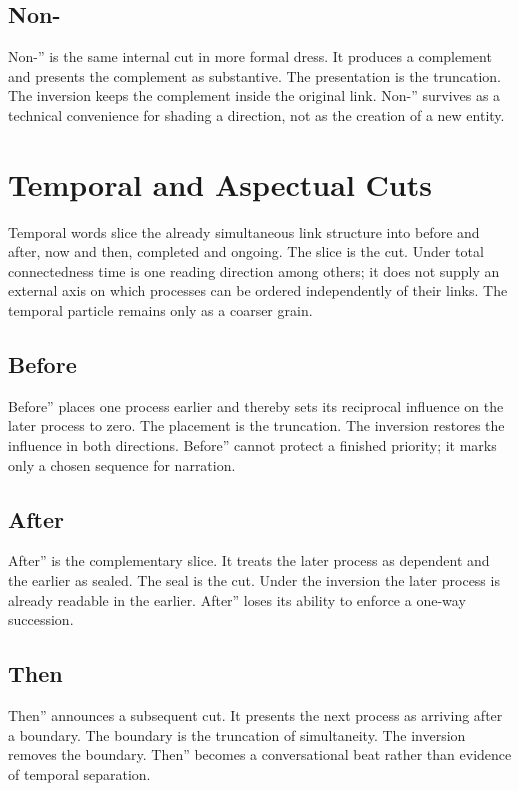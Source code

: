 \documentclass[11pt,a4paper]{article}
\begin{document}
\subsection{Non-} Non-'' is the same internal cut in more formal dress. It produces a complement and presents the complement as substantive. The presentation is the truncation. The inversion keeps the complement inside the original link. Non-'' survives as a technical convenience for shading a direction, not as the creation of a new entity.

\section{Temporal and Aspectual Cuts}

Temporal words slice the already simultaneous link structure into before and after, now and then, completed and ongoing. The slice is the cut. Under total connectedness time is one reading direction among others; it does not supply an external axis on which processes can be ordered independently of their links. The temporal particle remains only as a coarser grain.

\subsection{Before} Before'' places one process earlier and thereby sets its reciprocal influence on the later process to zero. The placement is the truncation. The inversion restores the influence in both directions. Before'' cannot protect a finished priority; it marks only a chosen sequence for narration.

\subsection{After} After'' is the complementary slice. It treats the later process as dependent and the earlier as sealed. The seal is the cut. Under the inversion the later process is already readable in the earlier. After'' loses its ability to enforce a one-way succession.

\subsection{Then} Then'' announces a subsequent cut. It presents the next process as arriving after a boundary. The boundary is the truncation of simultaneity. The inversion removes the boundary. Then'' becomes a conversational beat rather than evidence of temporal separation.
\end{document}
